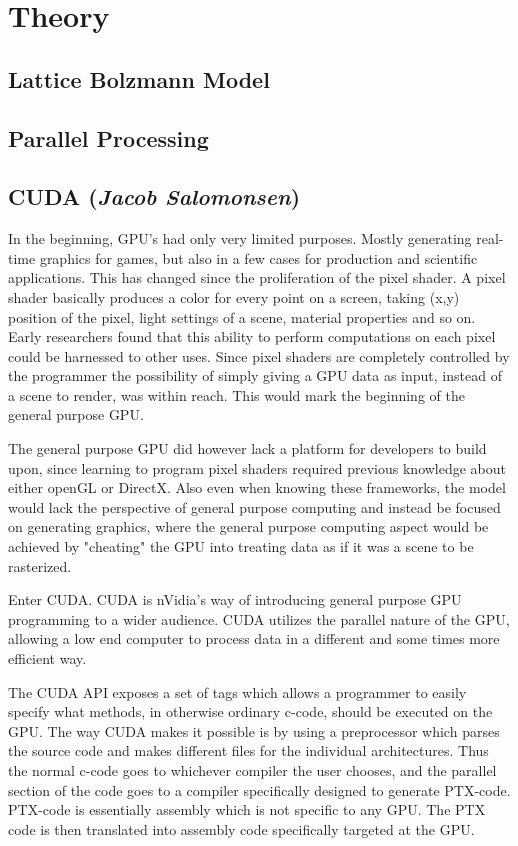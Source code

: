 \section{Theory}

\subsection{Lattice Bolzmann Model}

\subsection{Parallel Processing}

\subsection{CUDA (\textit{Jacob Salomonsen})}
In the beginning, GPU's had only very limited purposes. Mostly generating real-time graphics for games, but also in a few cases for production and scientific applications. This has changed since the proliferation of the pixel shader. A pixel shader basically produces a color for every point on a screen, taking (x,y) position of the pixel, light settings of a scene, material properties and so on. Early researchers found that this ability to perform computations on each pixel could be harnessed to other uses. Since pixel shaders are completely controlled by the programmer the possibility of simply giving a GPU data as input, instead of a scene to render, was within reach. This would mark the beginning of the general purpose GPU.

The general purpose GPU did however lack a platform for developers to build upon, since learning to program pixel shaders required previous knowledge about either openGL or DirectX. Also even when knowing these frameworks, the model would lack the perspective of general purpose computing and instead be focused on generating graphics, where the general purpose computing aspect would be achieved by "cheating" the GPU into treating data as if it was a scene to be rasterized.

Enter CUDA. CUDA is nVidia's way of introducing general purpose GPU programming to a wider audience. CUDA utilizes the parallel nature of the GPU, allowing a low end computer to process data in a different and some times more efficient way.

The CUDA API exposes a set of tags which allows a programmer to easily specify what methods, in otherwise ordinary c-code, should be executed on the GPU. The way CUDA makes it possible is by using a preprocessor which parses the source code and makes different files for the individual architectures. Thus the normal c-code goes to whichever compiler the user chooses, and the parallel section of the code goes to a compiler specifically designed to generate PTX-code. PTX-code is essentially assembly which is not specific to any GPU. The PTX code is then translated into assembly code specifically targeted at the GPU.

